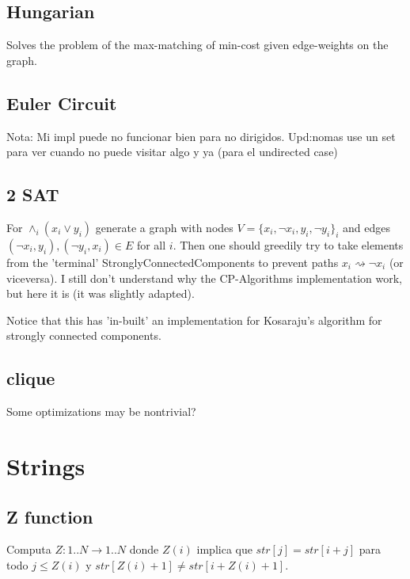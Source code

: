 \documentclass[landscape, 9pt, a4paper, oneside, twocolumn]{extarticle}
\begin{document}
	\subsection{Hungarian}
	Solves the problem of the max-matching of min-cost given edge-weights on the graph.
	
	
	\subsection{Euler Circuit}
	Nota: Mi impl puede no funcionar bien para no dirigidos. Upd:nomas use un set para ver cuando no puede visitar algo y ya (para el undirected case)
	
	
	\subsection{2 SAT}
	For $\land_i(x_i\lor y_i)$ generate a graph with nodes $V=\{x_i,\lnot x_i,y_i,\lnot y_i\}_i$ and edges $(\lnot x_i,y_i),(\lnot y_i,x_i)\in E$ for all $i$. Then one should greedily try to take elements from the 'terminal' StronglyConnectedComponents to prevent paths $x_i\rightsquigarrow\lnot x_i$ (or viceversa). I still don't understand why the CP-Algorithms implementation work, but here it is (it was slightly adapted).
	
	Notice that this has 'in-built' an implementation for Kosaraju's algorithm for strongly connected components.
	
	\subsection{clique}
	Some optimizations may be nontrivial?
	

\section{Strings}
	\subsection {Z function}
	Computa \(Z : 1..N\to 1..N\) donde \(Z(i)\) implica que \(str[j]=str[i+j]\) para todo \(j\leq Z(i)\) y \(str[Z(i)+1]\neq str[i+Z(i)+1]\).
	
	
\end{document}
